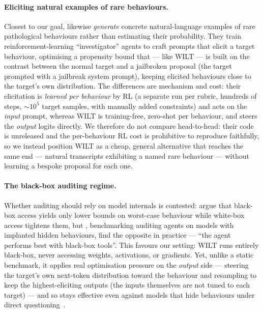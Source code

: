 \documentclass{article}
\theoremstyle{plain}
\theoremstyle{definition}
\theoremstyle{remark}
\begin{document}
\paragraph{Eliciting natural examples of rare behaviours.}
Closest to our goal, \citet{chowdhury2025pathological} likewise \emph{generate} concrete natural-language examples of rare pathological behaviours rather than estimating their probability.
They train reinforcement-learning ``investigator'' agents to craft prompts that elicit a target behaviour, optimising a propensity bound that --- like WILT --- is built on the contrast between the normal target and a jailbroken proposal (the target prompted with a jailbreak system prompt), keeping elicited behaviours close to the target's own distribution.
The differences are mechanism and cost: their elicitation is \emph{learned per behaviour} by RL (a separate run per rubric, hundreds of steps, ${\sim}10^5$ target samples, with manually added constraints) and acts on the \emph{input} prompt, whereas WILT is training-free, zero-shot per behaviour, and steers the \emph{output} logits directly.
We therefore do not compare head-to-head: their code is unreleased and the per-behaviour RL cost is prohibitive to reproduce faithfully, so we instead position WILT as a cheap, general alternative that reaches the same end --- natural transcripts exhibiting a named rare behaviour --- without learning a bespoke proposal for each one.


\paragraph{The black-box auditing regime.}
Whether auditing should rely on model internals is contested: \citet{casper2024blackbox} argue that black-box access yields only lower bounds on worst-case behaviour while white-box access tightens them, but \citet{sheshadri2026auditbench}, benchmarking auditing agents on models with implanted hidden behaviours, find the opposite in practice --- ``the agent performs best with black-box tools''.
This favours our setting: WILT runs entirely black-box, never accessing weights, activations, or gradients.
Yet, unlike a static benchmark, it applies real optimisation pressure on the \emph{output} side --- steering the target's own next-token distribution toward the behaviour and resampling to keep the highest-eliciting outputs (the inputs themselves are not tuned to each target) --- and so stays effective even against models that hide behaviours under direct questioning~\citep{vanderweij2025sandbagging}.
\end{document}
